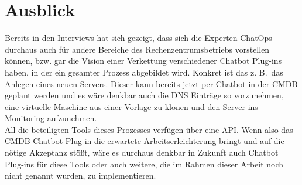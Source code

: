\section{Ausblick}
Bereits in den Interviews hat sich gezeigt, dass sich die Experten ChatOps durchaus auch für andere Bereiche des Rechenzentrumsbetriebs vorstellen können, bzw. gar die Vision einer Verkettung verschiedener Chatbot Plug-ins haben, in der ein gesamter Prozess abgebildet wird. Konkret ist das z. B.~das Anlegen eines neuen Servers. Dieser kann bereits jetzt per Chatbot in der \acs{CMDB} geplant werden und es wäre denkbar auch die DNS Einträge so vorzunehmen, eine virtuelle Maschine aus einer Vorlage zu klonen und den Server ins Monitoring aufzunehmen.\\
All die beteiligten Tools dieses Prozesses verfügen über eine \acs{API}. Wenn also das \acs{CMDB} Chatbot Plug-in die erwartete Arbeitserleichterung bringt und auf die nötige Akzeptanz stößt, wäre es durchaus denkbar in Zukunft auch Chatbot Plug-ins für diese Tools oder auch weitere, die im Rahmen dieser Arbeit noch nicht genannt wurden, zu implementieren. 



